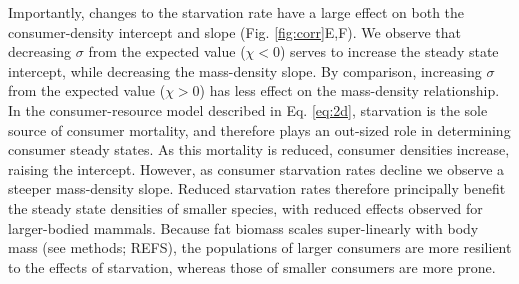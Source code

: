 \documentclass[]{rsos}%
\begin{document}
Importantly, changes to the starvation rate have a large effect on both the consumer-density intercept and slope (Fig. \ref{fig:corr}E,F).
We observe that decreasing $\sigma$ from the expected value ($\chi<0$) serves to increase the steady state intercept, while decreasing the mass-density slope.
By comparison, increasing $\sigma$ from the expected value ($\chi>0$) has less effect on the mass-density relationship.
In the consumer-resource model described in Eq. \ref{eq:2d}, starvation is the sole source of consumer mortality, and therefore plays an out-sized role in determining consumer steady states. 
As this mortality is reduced, consumer densities increase, raising the intercept.
However, as consumer starvation rates decline we observe a steeper mass-density slope.
Reduced starvation rates therefore principally benefit the steady state densities of smaller species, with reduced effects observed for larger-bodied mammals.
Because fat biomass scales super-linearly with body mass (see methods; REFS), the populations of larger consumers are more resilient to the effects of starvation, whereas those of smaller consumers are more prone.

\end{document}
